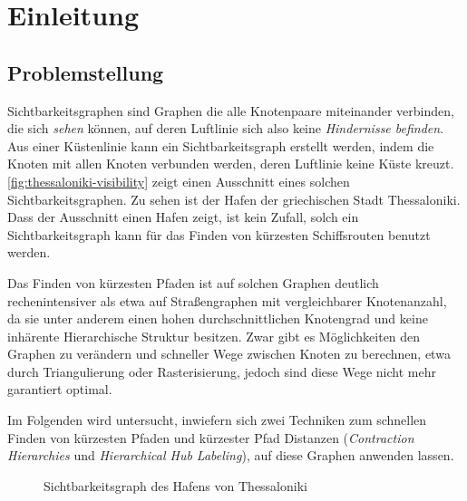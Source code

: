 \chapter{Einleitung}

\section{Problemstellung}
Sichtbarkeitsgraphen sind Graphen die alle Knotenpaare miteinander verbinden, die sich \emph{sehen} können, auf deren Luftlinie sich also keine \emph{Hindernisse befinden}.
Aus einer Küstenlinie kann ein Sichtbarkeitsgraph erstellt werden, indem die Knoten mit allen Knoten verbunden werden, deren Luftlinie keine Küste kreuzt.
\autoref{fig:thessaloniki-visibility} zeigt einen Ausschnitt eines solchen Sichtbarkeitsgraphen.
Zu sehen ist der Hafen der griechischen Stadt Thessaloniki.
Dass der Ausschnitt einen Hafen zeigt, ist kein Zufall, solch ein Sichtbarkeitsgraph kann für das Finden von kürzesten Schiffsrouten benutzt werden.

Das Finden von kürzesten Pfaden ist auf solchen Graphen deutlich rechenintensiver als etwa auf Straßengraphen mit vergleichbarer Knotenanzahl, da sie unter anderem einen hohen durchschnittlichen Knotengrad und keine inhärente Hierarchische Struktur besitzen.
Zwar gibt es Möglichkeiten den Graphen zu verändern und schneller Wege zwischen Knoten zu berechnen, etwa durch Triangulierung oder Rasterisierung, jedoch sind diese Wege nicht mehr garantiert optimal.

Im Folgenden wird untersucht, inwiefern sich zwei Techniken zum schnellen Finden von kürzesten Pfaden und kürzester Pfad Distanzen (\emph{Contraction Hierarchies} und \emph{Hierarchical Hub Labeling}), auf diese Graphen anwenden lassen.

\begin{figure}[ht]%
    \centering
    \caption{Sichtbarkeitsgraph des Hafens von Thessaloniki}%
    \label{fig:thessaloniki-visibility}%
\end{figure}

